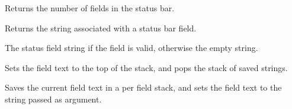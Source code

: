 
Returns the number of fields in the status bar.

\label{wxstatusbargetstatustext}


Returns the string associated with a status bar field.




The status field string if the field is valid, otherwise the empty string.



\label{wxstatusbarpushstatustext}


Sets the field text to the top of the stack, and pops the stack of saved
strings.



\label{wxstatusbarpushstatustext}


Saves the current field text in a per field stack, and sets the field text
to the string passed as argument.

